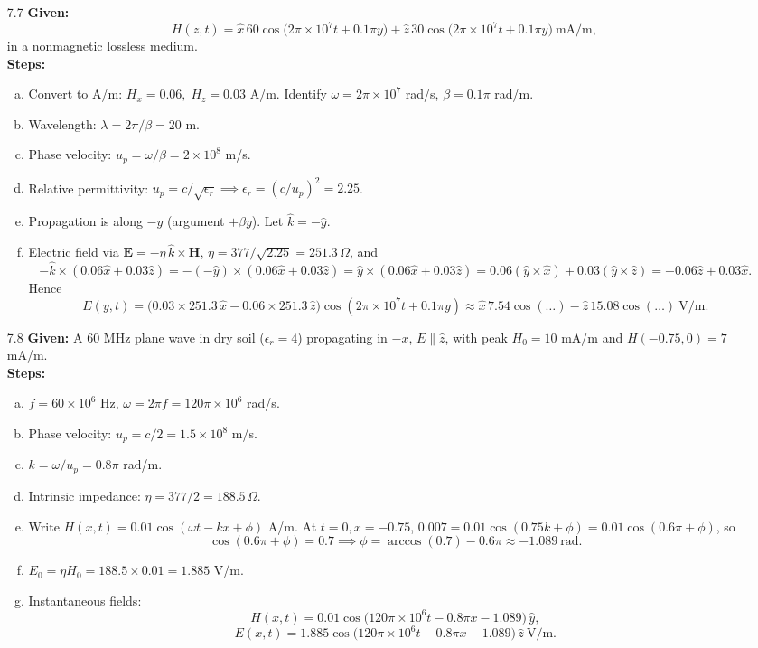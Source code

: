 \begin{enumerate}
\item[7.7] \textbf{Given:}
\[H(z,t)=\hat x\,60\cos\bigl(2\pi\times10^7t+0.1\pi y\bigr)
+\hat z\,30\cos\bigl(2\pi\times10^7t+0.1\pi y\bigr)\ \mathrm{mA/m},\]
in a nonmagnetic lossless medium.  
\\
\textbf{Steps:}
\begin{enumerate}[(a)]
  \item Convert to A/m: $H_x=0.06,\;H_z=0.03$ A/m.  Identify $\omega=2\pi\times10^7$ rad/s, $\beta=0.1\pi$ rad/m.
  \item Wavelength: $\lambda=2\pi/\beta=20$ m.  
  \item Phase velocity: $u_p=\omega/\beta=2\times10^8$ m/s.  
  \item Relative permittivity: $u_p=c/\sqrt{\epsilon_r}\implies\epsilon_r=(c/u_p)^2=2.25$.  
  \item Propagation is along $-y$ (argument $+\beta y$).  Let $\hat k=-\hat y$.  
  \item Electric field via $\mathbf E=-\eta\,\hat k\times\mathbf H$, $\eta=377/\sqrt{2.25}=251.3\,\Omega$, and
  \[
    -\hat k\times(0.06\hat x+0.03\hat z)
    =-(-\hat y)\times(0.06\hat x+0.03\hat z)
    =\hat y\times(0.06\hat x+0.03\hat z)
    =0.06(\hat y\times\hat x)+0.03(\hat y\times\hat z)
    =-0.06\hat z+0.03\hat x.
  \]
  Hence
  \[
    E(y,t)=\bigl(0.03\times251.3\,\hat x -0.06\times251.3\,\hat z\bigr)
    \cos(2\pi\times10^7t+0.1\pi y)
    \approx\hat x\,7.54\cos(\dots)-\hat z\,15.08\cos(\dots)~\mathrm{V/m}.
  \]
\end{enumerate}

\item[7.8] \textbf{Given:} A 60 MHz plane wave in dry soil ($\epsilon_r=4$) propagating in $-x$, $E\parallel\hat z$, with
peak $H_0=10$ mA/m and $H(-0.75,0)=7$ mA/m.  
\\
\textbf{Steps:}
\begin{enumerate}[(a)]
  \item $f=60\times10^6$ Hz, $\omega=2\pi f=120\pi\times10^6$ rad/s.  
  \item Phase velocity: $u_p=c/2=1.5\times10^8$ m/s.  
  \item $k=\omega/u_p=0.8\pi$ rad/m.  
  \item Intrinsic impedance: $\eta=377/2=188.5\,\Omega$.  
  \item Write $H(x,t)=0.01\cos(\omega t - kx+\phi)$ A/m.  At $t=0,x=-0.75$,  $0.007=0.01\cos(0.75k+\phi)=0.01\cos(0.6\pi+\phi)$, so
  \[\cos(0.6\pi+\phi)=0.7\implies\phi=\arccos(0.7)-0.6\pi\approx-1.089~\mathrm{rad}.\]
  \item $E_0=\eta H_0=188.5\times0.01=1.885$ V/m.  
  \item Instantaneous fields:
  \[
    H(x,t)=0.01\cos\bigl(120\pi\times10^6t-0.8\pi x-1.089\bigr)\,\hat y,\]
  \[
    E(x,t)=1.885\cos\bigl(120\pi\times10^6t-0.8\pi x-1.089\bigr)\,\hat z~\mathrm{V/m}.
  \]
\end{enumerate}


\end{enumerate}
